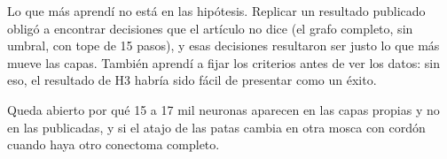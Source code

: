\documentclass[11pt,letterpaper]{article}
\begin{document}
Lo que más aprendí no está en las hipótesis. Replicar un resultado publicado obligó a encontrar decisiones que el artículo no dice (el grafo completo, sin umbral, con tope de 15 pasos), y esas decisiones resultaron ser justo lo que más mueve las capas. También aprendí a fijar los criterios antes de ver los datos: sin eso, el resultado de H3 habría sido fácil de presentar como un éxito.

Queda abierto por qué 15 a 17 mil neuronas aparecen en las capas propias y no en las publicadas, y si el atajo de las patas cambia en otra mosca con cordón cuando haya otro conectoma completo.



\end{document}

